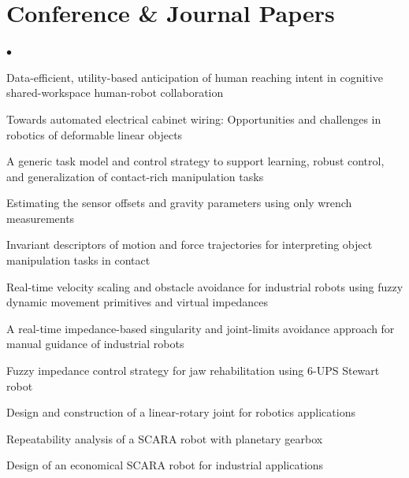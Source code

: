 \documentclass[lighthipster]{simplehipstercv}
\begin{document}
	\section*{Conference \& Journal Papers}
	\begin{minipage}{\textwidth}
		\begin{list}{$\bullet$}{%
				\setlength{\leftmargin}{10pt}    %
				\setlength{\labelwidth}{1em}    %
				\setlength{\labelsep}{0.5em}    %
				\setlength{\itemsep}{0pt}       %
				\setlength{\parsep}{0pt}
				\setlength{\topsep}{0pt}
				\setlength{\partopsep}{0pt}
			}
			\item Data-efficient, utility-based anticipation of human reaching intent in cognitive shared-workspace human-robot collaboration
			\item Towards automated electrical cabinet wiring: Opportunities and challenges in robotics of deformable linear objects
			\item A generic task model and control strategy to support learning, robust control, and generalization of contact-rich manipulation tasks
			\item Estimating the sensor offsets and gravity parameters using only wrench measurements
			\item Invariant descriptors of motion and force trajectories for interpreting object manipulation tasks in contact
			\item Real-time velocity scaling and obstacle avoidance for industrial robots using fuzzy dynamic movement primitives and virtual impedances
			\item A real-time impedance-based singularity and joint-limits avoidance approach for manual guidance of industrial robots
			\item Fuzzy impedance control strategy for jaw rehabilitation using 6-UPS Stewart robot
			\item Design and construction of a linear-rotary joint for robotics applications
			\item Repeatability analysis of a SCARA robot with planetary gearbox
			\item Design of an economical SCARA robot for industrial applications
		\end{list}
	\end{minipage}
\end{document}

